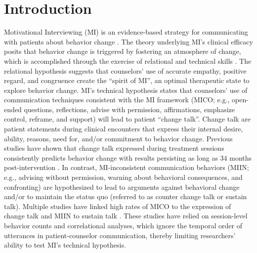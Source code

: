 \section{Introduction}
\label{sec:intro}
Motivational Interviewing (MI) is an evidence-based strategy for communicating with patients about behavior change \cite{miller2013motivational}. The theory underlying MI’s clinical efficacy posits that behavior change is triggered by fostering an atmosphere of change, which is accomplished through the exercise of relational and technical skills \cite{miller2013motivational}. The relational hypothesis suggests that counselors’ use of accurate empathy, positive regard, and congruence create the “spirit of MI”, an optimal therapeutic state to explore behavior change. MI’s technical hypothesis \cite{miller2009toward} states that counselors’ use of communication techniques consistent with the MI framework (MICO; e.g., open-ended questions, reflections, advise with permission, affirmations, emphasize control, reframe, and support) will lead to patient “change talk”. Change talk are patient statements during clinical encounters that express their internal desire, ability, reasons, need for, and/or commitment to behavior change. Previous studies \cite{apodaca2009mechanisms} have shown that change talk expressed during treatment sessions consistently predicts behavior change with results persisting as long as 34 months post-intervention \cite{walker2011influence}. In contrast, MI-inconsistent communication behaviors (MIIN; e.g., advising without permission, warning about behavioral consequences, and confronting) are hypothesized to lead to arguments against behavioral change and/or to maintain the status quo (referred to as counter change talk or sustain talk). Multiple studies have linked high rates of MICO to the expression of change talk and MIIN to sustain talk \cite{magill2014technical}. These studies have relied on session-level behavior counts and correlational analyses, which ignore the temporal order of utterances in patient-counselor communication, thereby limiting researchers’ ability to test MI’s technical hypothesis. 

